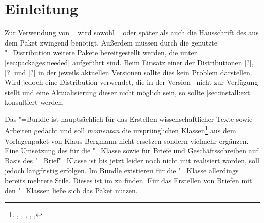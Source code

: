 \chapter{Einleitung}
%
Zur Verwendung von \TUDScript~\vTUDScript{} wird sowohl 
\KOMAScript~\vKOMAScript{} oder später als auch die Hausschrift des 
\CDs \OpenSans aus dem Paket  zwingend benötigt. Außerdem 
müssen durch die genutzte "=Distribution weitere Pakete 
bereitgestellt werden, die unter \autoref{sec:packages:needed} aufgeführt sind. 
Beim Einsatz einer der Distributionen 
|?|,
|?| und 
|?|
in der jeweils aktuellen Versionen sollte dies kein Problem darstellen. Wird 
jedoch eine Distribution verwendet, die \TUDScript in der Version~\vTUDScript{} 
nicht zur Verfügung stellt und eine Aktualisierung dieser nicht möglich sein, 
so sollte \autoref{sec:install:ext} konsultiert werden.

Das \TUDScript"=Bundle ist hauptsächlich für das Erstellen wissenschaftlicher 
Texte sowie Arbeiten gedacht und soll \emph{momentan} die ursprünglichen 
Klassen\footnote{%
  , , , , 
  , %
} aus dem Vorlagenpaket von Klaus Bergmann nicht ersetzen sondern vielmehr 
ergänzen. 
%
Eine Umsetzung des \CDs für die "=Klasse sowie für Briefe und 
Geschäftsschreiben auf Basis des \KOMAScript"=Brief"=Klasse  
ist bis jetzt leider noch nicht mit \TUDScript realisiert worden, soll jedoch 
langfristig erfolgen. Im Bundle  existieren für die 
"=Klasse allerdings bereits mehrere Stile. Dieses ist im 
 zu finden. Für das Erstellen von Briefen mit den \TUDScript"=Klassen ließe 
sich das Paket  nutzen.



